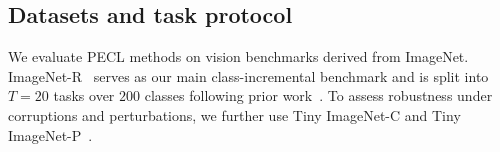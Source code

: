 \documentclass{article}
\theoremstyle{plain}
\theoremstyle{definition}
\theoremstyle{remark}
\begin{document}



\subsection{Datasets and task protocol}

We evaluate PECL methods on vision benchmarks derived from ImageNet. ImageNet-R~\cite{ImagenetR_Hendrycks_2021_ICCV} serves as our main class-incremental benchmark and is split into $T=20$ tasks over $200$ classes following prior work~\cite{liangInfLoRAInterferenceFreeLowRank2024a}. To assess robustness under corruptions and perturbations, we further use Tiny ImageNet-C and Tiny ImageNet-P~\cite{hendrycks2018benchmarking}. 
\end{document}
